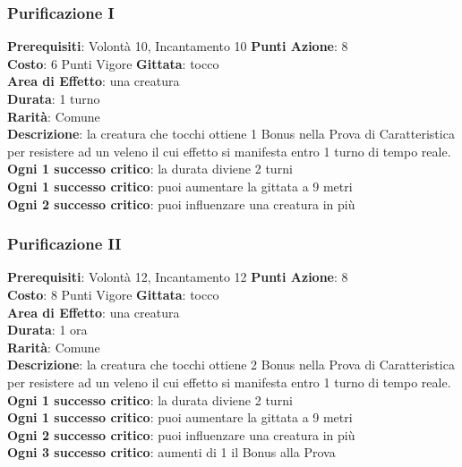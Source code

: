 \documentclass[12pt,a4paper,twoside,openany]{book}
\begin{document}
\begin{multicols}{2}
\subsubsection*{Purificazione I}
\textbf{Prerequisiti}: Volontà 10, Incantamento 10
\textbf{Punti Azione}: 8\\
\textbf{Costo}: 6 Punti Vigore
\textbf{Gittata}: tocco \\
\textbf{Area di Effetto}: una creatura\\
\textbf{Durata}: 1 turno\\
\textbf{Rarità}: Comune\\
\textbf{Descrizione}: la creatura che tocchi ottiene 1 Bonus nella Prova di Caratteristica per resistere ad un veleno il cui effetto si manifesta entro 1 turno di tempo reale.\\
\textbf{Ogni 1 successo critico}: la durata diviene 2 turni\\
\textbf{Ogni 1 successo critico}: puoi aumentare la gittata a 9 metri\\
\textbf{Ogni 2 successo critico}: puoi influenzare una creatura in più

\subsubsection*{Purificazione II}
\textbf{Prerequisiti}: Volontà 12, Incantamento 12
\textbf{Punti Azione}: 8\\
\textbf{Costo}: 8 Punti Vigore
\textbf{Gittata}: tocco \\
\textbf{Area di Effetto}: una creatura\\
\textbf{Durata}: 1 ora\\
\textbf{Rarità}: Comune\\
\textbf{Descrizione}: la creatura che tocchi ottiene 2 Bonus nella Prova di Caratteristica per resistere ad un veleno il cui effetto si manifesta entro 1 turno di tempo reale.\\
\textbf{Ogni 1 successo critico}: la durata diviene 2 turni\\
\textbf{Ogni 1 successo critico}: puoi aumentare la gittata a 9 metri\\
\textbf{Ogni 2 successo critico}: puoi influenzare una creatura in più\\
\textbf{Ogni 3 successo critico}: aumenti di 1 il Bonus alla Prova


\end{multicols}
\end{document}
